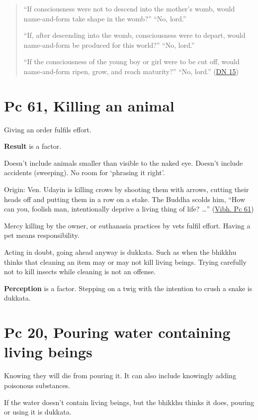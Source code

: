 \begin{quote}
``If consciousness were not to descend into the mother's womb, would
name-and-form take shape in the womb?'' ``No, lord.''

``If, after descending into the womb, consciousness were to depart,
would name-and-form be produced for this world?'' ``No, lord.''

``If the consciousness of the young boy or girl were to be cut off,
would name-and-form ripen, grow, and reach maturity?'' ``No, lord.''
(\href{https://www.accesstoinsight.org/tipitaka/dn/dn.15.0.than.html}{DN
15})
\end{quote}

\section{Pc 61, Killing an animal}

Giving an order fulfils effort.

\textbf{Result} is a factor.

Doesn't include animals smaller than visible to the naked eye. Doesn't
include accidents (sweeping). No room for `phrasing it right'.

Origin: Ven. Udayin is killing crows by shooting them with arrows,
cutting their heads off and putting them in a row on a stake. The Buddha
scolds him, ``How can you, foolish man, intentionally deprive a living
thing of life? \ldots{}''
(\href{https://suttacentral.net/pli-tv-bu-vb-pc61/en/horner}{Vibh. Pc
61})

Mercy killing by the owner, or euthanasia practices by vets fulfil
effort. Having a pet means responsibility.

Acting in doubt, going ahead anyway is dukkata. Such as when the bhikkhu
thinks that cleaning an item may or may not kill living beings. Trying
carefully not to kill insects while cleaning is not an offense.

\textbf{Perception} is a factor. Stepping on a twig with the intention
to crush a snake is dukkata.

\section{Pc 20, Pouring water containing living beings}

Knowing they will die from pouring it. It can also include knowingly
adding poisonous substances.

If the water doesn't contain living beings, but the bhikkhu thinks it
does, pouring or using it is dukkata.

